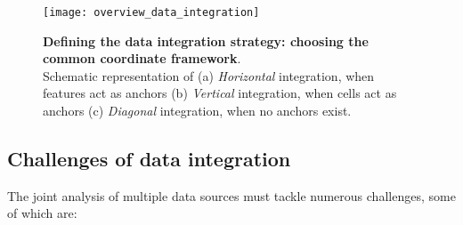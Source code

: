 \begin{figure}[H]
	\centering
	\texttt{[image: overview\_data\_integration]}
	\caption{\textbf{Defining the data integration strategy: choosing the common coordinate framework}.\\Schematic representation of (a) \textit{Horizontal} integration, when features act as anchors (b) \textit{Vertical} integration, when cells act as anchors (c) \textit{Diagonal} integration, when no anchors exist. }
	\label{fig:overview_data_integration}
\end{figure}

\subsection{Challenges of data integration} \label{integrative_analysis_challenges}

The joint analysis of multiple data sources must tackle numerous challenges, some of which are:

